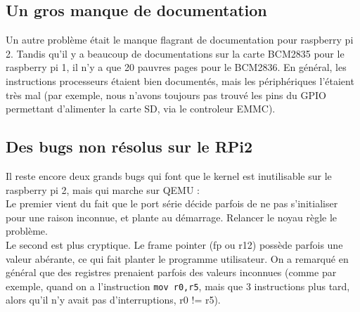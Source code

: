 \documentclass[a4paper]{article}
\begin{document}
\subsection{Un gros manque de documentation}

Un autre problème était le manque flagrant de documentation pour raspberry pi 2.
Tandis qu'il y a beaucoup de documentations sur la carte BCM2835 pour le
raspberry pi 1, il n'y a que 20 pauvres pages pour le BCM2836. En général, les
instructions processeurs étaient bien documentés, mais les périphériques
l'étaient très mal (par exemple, nous n'avons toujours pas trouvé les pins du
GPIO permettant d'alimenter la carte SD, via le controleur EMMC).

\subsection{Des bugs non résolus sur le RPi2}

Il reste encore deux grands bugs qui font que le kernel est inutilisable sur le
raspberry pi 2, mais qui marche sur QEMU :\\

Le premier vient du fait que le port série décide parfois de ne pas
s'initialiser pour une raison inconnue, et plante au démarrage. Relancer le
noyau règle le problème.\\

Le second est plus cryptique. Le frame pointer (fp ou r12) possède parfois une
valeur abérante, ce qui fait planter le programme utilisateur. On a remarqué en
général que des registres prenaient parfois des valeurs inconnues (comme par
exemple, quand on a l'instruction \verb!mov r0,r5!, mais que 3 instructions plus
tard, alors qu'il n'y avait pas d'interruptions, r0 != r5).
\end{document}
